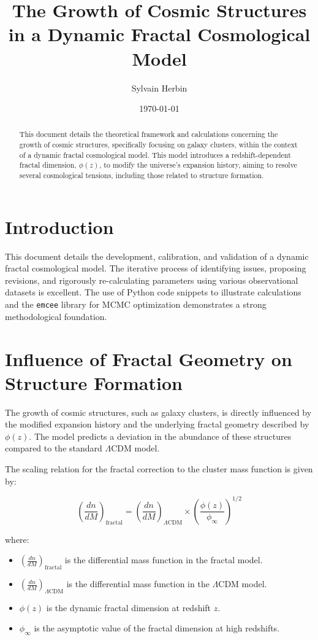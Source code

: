 \documentclass{article}
\title{The Growth of Cosmic Structures in a Dynamic Fractal Cosmological Model}
\author{Sylvain Herbin\orcidlink{0009-0001-3390-5012}}
\date{\today}
\begin{document}
\maketitle

\begin{abstract}
This document details the theoretical framework and calculations concerning the growth of cosmic structures, specifically focusing on galaxy clusters, within the context of a dynamic fractal cosmological model. This model introduces a redshift-dependent fractal dimension, $\phi(z)$, to modify the universe's expansion history, aiming to resolve several cosmological tensions, including those related to structure formation.
\end{abstract}

\tableofcontents
\newpage

\section{Introduction}
This document details the development, calibration, and validation of a dynamic fractal cosmological model. The iterative process of identifying issues, proposing revisions, and rigorously re-calculating parameters using various observational datasets is excellent. The use of Python code snippets to illustrate calculations and the \texttt{emcee} library for MCMC optimization demonstrates a strong methodological foundation.

\section{Influence of Fractal Geometry on Structure Formation}
The growth of cosmic structures, such as galaxy clusters, is directly influenced by the modified expansion history and the underlying fractal geometry described by $\phi(z)$. The model predicts a deviation in the abundance of these structures compared to the standard $\Lambda$CDM model.

The scaling relation for the fractal correction to the cluster mass function is given by:

$$ \left(\frac{dn}{dM}\right)_{\text{fractal}} = \left(\frac{dn}{dM}\right)_{\Lambda\text{CDM}} \times \left(\frac{\phi(z)}{\phi_{\infty}}\right)^{1/2} $$

where:
\begin{itemize}
    \item $\left(\frac{dn}{dM}\right)_{\text{fractal}}$ is the differential mass function in the fractal model.
    \item $\left(\frac{dn}{dM}\right)_{\Lambda\text{CDM}}$ is the differential mass function in the $\Lambda$CDM model.
    \item $\phi(z)$ is the dynamic fractal dimension at redshift $z$.
    \item $\phi_{\infty}$ is the asymptotic value of the fractal dimension at high redshifts.
\end{itemize}
\end{document}
